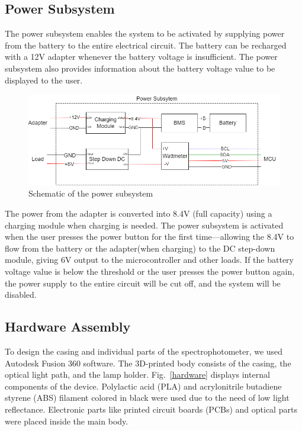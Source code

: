 \documentclass[conference]{IEEEtran}
\begin{document}
\subsection{Power Subsystem}
The power subsystem enables the system to be activated by supplying power from the battery to the entire electrical circuit. 
The battery can be recharged with a 12V adapter whenever the battery voltage is insufficient. 
The power subsystem also provides information about the battery voltage value to be displayed to the user. 

\begin{figure}[htbp]
    \centerline{\includegraphics[scale=0.3]{power-schematic.png}}
    \caption{Schematic of the power subsystem}
    \label{power-dfd}
    \end{figure}

The power from the adapter is converted into 8.4V (full capacity) using a charging module when charging is needed.
The power subsystem is activated when the user presses the power button for the first time—allowing the 8.4V to flow from the battery or the adapter(when charging) to the DC step-down module, giving 6V output to the microcontroller and other loads. 
If the battery voltage value is below the threshold or the user presses the power button again, the power supply to the entire circuit will be cut off, and the system will be disabled.

\subsection{Hardware Assembly}
To design the casing and individual parts of the spectrophotometer, we used Autodesk Fusion 360 software.
The 3D-printed body consists of the casing, the optical light path, and the lamp holder.
Fig.~\ref{hardware} displays internal components of the device.
Polylactic acid (PLA) and acrylonitrile butadiene styrene (ABS) filament colored in black were used due to the need of low light reflectance.
Electronic parts like printed circuit boards (PCBs) and optical parts were placed inside the main body.
\end{document}
